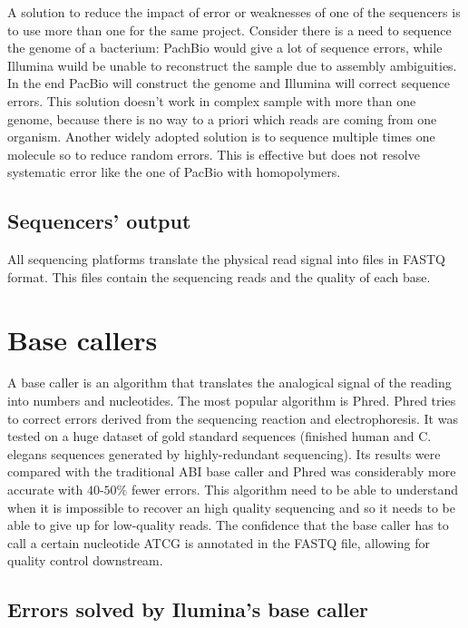 	A solution to reduce the impact of error or weaknesses of one of the sequencers is to use more than one for the same project.
	Consider there is a need to sequence the genome of a bacterium: PachBio would give a lot of sequence errors, while Illumina wuild be unable to reconstruct the sample due to assembly ambiguities.
	In the end PacBio will construct the genome and Illumina will correct sequence errors.
	This solution doesn't work in complex sample with more than one genome, because there is no way to a priori which reads are coming from one organism.
	Another widely adopted solution is to sequence multiple times one molecule so to reduce random errors.
	This is effective but does not resolve systematic error like the one of PacBio with homopolymers.

	\subsection{Sequencers' output}
	All sequencing platforms translate the physical read signal into files in FASTQ format.
	This files contain the sequencing reads and the quality of each base.

\section{Base callers}
A base caller is an algorithm that translates the analogical signal of the reading into numbers and nucleotides.
The most popular algorithm is Phred.
Phred tries to correct errors derived from the sequencing reaction and electrophoresis.
It was tested on a huge dataset of gold standard sequences (finished human and C. elegans sequences generated by highly-redundant sequencing).
Its results were compared with the traditional ABI base caller and Phred was considerably more accurate with $40$-$50\%$ fewer errors.
This algorithm need to be able to understand when it is impossible to recover an high quality sequencing and so it needs to be able to give up for low-quality reads.
The confidence that the base caller has to call a certain nucleotide ATCG is annotated in the FASTQ file, allowing for quality control downstream.

	\subsection{Errors solved by Ilumina's base caller}

